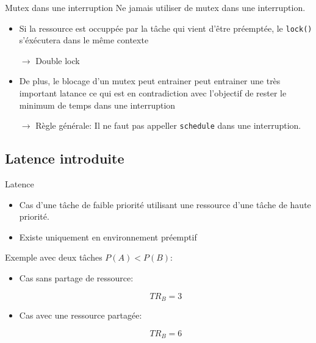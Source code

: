 \begin{frame}[fragile]{Mutex dans une interruption}
  Ne jamais utiliser de mutex dans une interruption.
  \begin{itemize} 
  \item Si  la ressource  est occuppée par  la tâche qui  vient d'être
    préemptée, le \texttt{lock()} s'éxécutera dans le même contexte
  \item[$\rightarrow$] Double lock
  \item De plus,  le blocage d'un mutex peut  entrainer peut entrainer
    une  très  important latance  ce  qui  est  en contradiction  avec
    l'objectif de rester le minimum de temps dans une interruption
  \item[$\rightarrow$] Règle générale: Il ne faut pas appeller \texttt{schedule} dans une interruption.
  \end{itemize} 
\end{frame} 

\subsection{Latence introduite}

\begin{frame}{Latence}
  \begin{itemize} 
  \item  Cas d'une tâche  de faible  priorité utilisant  une ressource
    d'une tâche de haute priorité.
  \item Existe uniquement en environnement préemptif
  \end{itemize} 
  Exemple avec deux tâches $P(A) < P(B)$:
  \begin{itemize} 
  \item Cas sans partage de ressource:
    \begin{center}
      $$TR_B = 3$$
    \end{center}
  \item Cas avec une ressource partagée:
    \begin{center}
      $$TR_B = 6$$
    \end{center}
  \end{itemize} 
    
\end{frame} 

